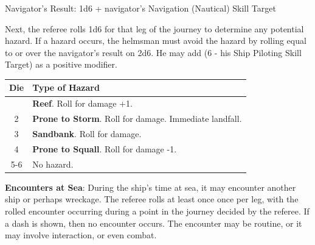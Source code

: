 \documentclass{book}
\begin{document}
Navigator's Result: 1d6 + navigator's Navigation (Nautical) Skill Target

Next, the referee rolls 1d6 for that leg of the journey to determine any
potential hazard. If a hazard occurs, the helmsman must avoid the hazard
by rolling equal to or over the navigator's result on 2d6. He may add (6
- his Ship Piloting Skill Target) as a positive modifier.

\begin{longtable}[]{@{}cl@{}}
\toprule\noalign{}
Die & Type of Hazard \\
\midrule\noalign{}
\endhead
\bottomrule\noalign{}
\endlastfoot
1 & \textbf{Reef}. Roll for damage +1. \\
2 & \textbf{Prone to Storm}. Roll for damage. Immediate landfall. \\
3 & \textbf{Sandbank}. Roll for damage. \\
4 & \textbf{Prone to Squall}. Roll for damage -1. \\
5-6 & No hazard. \\
\end{longtable}

\newpage

\textbf{Encounters at Sea}: During the ship's time at sea, it may
encounter another ship or perhaps wreckage. The referee rolls at least
once once per leg, with the rolled encounter occurring during a point in
the journey decided by the referee. If a dash is shown, then no
encounter occurs. The encounter may be routine, or it may involve
interaction, or even combat.
\end{document}
